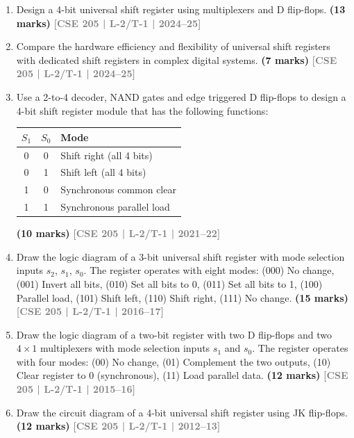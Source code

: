 \documentclass[12pt,a3paper]{article}
\newcommand{\yr}[1]{\hfill\textcolor{gray}{\small\textbf{[#1]}}}
\newcommand{\mk}[1]{\textcolor{orange!70!black}{\small\textbf{(#1 marks)}}}
\begin{document}
\begin{enumerate}

\item Design a 4-bit universal shift register using multiplexers and D flip-flops.
\mk{13} \yr{CSE 205 | L-2/T-1 | 2024--25}

\item Compare the hardware efficiency and flexibility of universal shift registers with dedicated shift registers in complex digital systems.
\mk{7} \yr{CSE 205 | L-2/T-1 | 2024--25}

\item Use a 2-to-4 decoder, NAND gates and edge triggered D flip-flops to design a 4-bit shift register module that has the following functions:
\begin{center}
\begin{tabular}{|c|c|l|}
\hline
$S_1$ & $S_0$ & Mode \\
\hline
0 & 0 & Shift right (all 4 bits)\\
0 & 1 & Shift left (all 4 bits)\\
1 & 0 & Synchronous common clear \\
1 & 1 & Synchronous parallel load \\
\hline
\end{tabular}
\end{center}
\mk{10} \yr{CSE 205 | L-2/T-1 | 2021--22}

\item Draw the logic diagram of a 3-bit universal shift register with mode selection inputs $s_2$, $s_1$, $s_0$. The register operates with eight modes: (000) No change, (001) Invert all bits, (010) Set all bits to 0, (011) Set all bits to 1, (100) Parallel load, (101) Shift left, (110) Shift right, (111) No change.
\mk{15} \yr{CSE 205 | L-2/T-1 | 2016--17}

\item Draw the logic diagram of a two-bit register with two D flip-flops and two $4\times1$ multiplexers with mode selection inputs $s_1$ and $s_0$. The register operates with four modes: (00) No change, (01) Complement the two outputs, (10) Clear register to 0 (synchronous), (11) Load parallel data.
\mk{12} \yr{CSE 205 | L-2/T-1 | 2015--16}


\item Draw the circuit diagram of a 4-bit universal shift register using JK flip-flops.
\mk{12} \yr{CSE 205 | L-2/T-1 | 2012--13}


\end{enumerate}
\end{document}
